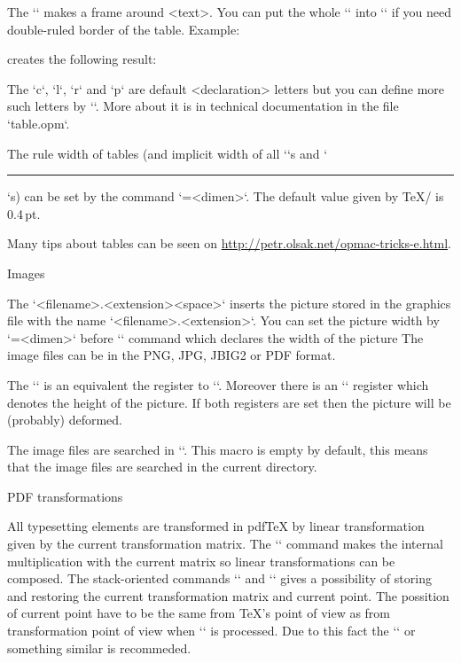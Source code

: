 {The `` makes a frame around <text>. You can put the whole `\table`
into `\frame` if you need double-ruled border of the table. Example:

\begtt
{}
\endtt
%
creates the following result:

\hfil{}
\bigskip

The `c`, `l`, `r` and `p` are default <declaration> letters but you can define
more such letters by `\def\tabdeclare<letter>{<left>##<right>}`. More about
it is in technical documentation in the file `table.opm`.

The rule width of tables (and implicit width of all `\vrule`s and `\hrule`s)
can be set by the command `=<dimen>`. The default value given 
by \TeX/ is 0.4\,pt.

Many tips about tables can be seen on
\url{http://petr.olsak.net/opmac-tricks-e.html}.


\sec Images

The `\inspic <filename>.<extension><space>` inserts the picture stored in
the graphics file  with the name `<filename>.<extension>`. 
You can set the picture width by `\picw=<dimen>`
before `\inspic` command which declares the width of the picture 
The image files can be in the PNG, JPG, JBIG2 or PDF format. 

The `\picwidth` is an equivalent the register to `\picw`. Moreover there is an
`\picheight` register which denotes the height of the picture. If both
registers are set then the picture will be (probably) deformed. 

The image files are searched in `\picdir`. This macro is empty by default, this
means that the image files are searched in the current directory.



\sec PDF transformations

All typesetting elements are transformed in pdf\TeX{} by linear
transformation given by the current transformation matrix. The
`` command makes the internal multiplication
with the current matrix so linear transformations can be composed. The
stack-oriented commands `\pdfsave` and `\pdfrestore` gives a possibility of
storing and restoring the current transformation matrix and current point.
The possition of current point have to be the same from \TeX{}'s point of
view as from transformation point of view when `\pdfrestore` is processed.
Due to this fact the `\pdfsave{}\pdfrestore` 
or something similar is recommeded.

}
